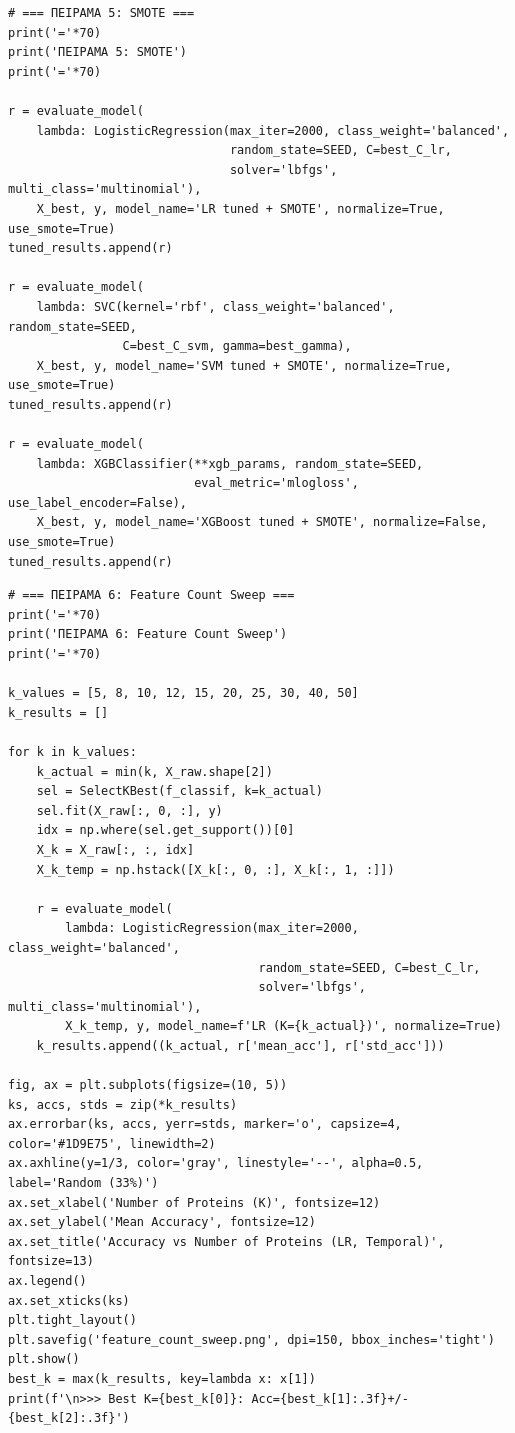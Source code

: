 \begin{lstlisting}
# === ΠΕΙΡΑΜΑ 5: SMOTE ===
print('='*70)
print('ΠΕΙΡΑΜΑ 5: SMOTE')
print('='*70)
 
r = evaluate_model(
    lambda: LogisticRegression(max_iter=2000, class_weight='balanced',
                               random_state=SEED, C=best_C_lr,
                               solver='lbfgs', multi_class='multinomial'),
    X_best, y, model_name='LR tuned + SMOTE', normalize=True, use_smote=True)
tuned_results.append(r)
 
r = evaluate_model(
    lambda: SVC(kernel='rbf', class_weight='balanced', random_state=SEED,
                C=best_C_svm, gamma=best_gamma),
    X_best, y, model_name='SVM tuned + SMOTE', normalize=True, use_smote=True)
tuned_results.append(r)
 
r = evaluate_model(
    lambda: XGBClassifier(**xgb_params, random_state=SEED,
                          eval_metric='mlogloss', use_label_encoder=False),
    X_best, y, model_name='XGBoost tuned + SMOTE', normalize=False, use_smote=True)
tuned_results.append(r)
\end{lstlisting}
 
\begin{lstlisting}
# === ΠΕΙΡΑΜΑ 6: Feature Count Sweep ===
print('='*70)
print('ΠΕΙΡΑΜΑ 6: Feature Count Sweep')
print('='*70)
 
k_values = [5, 8, 10, 12, 15, 20, 25, 30, 40, 50]
k_results = []
 
for k in k_values:
    k_actual = min(k, X_raw.shape[2])
    sel = SelectKBest(f_classif, k=k_actual)
    sel.fit(X_raw[:, 0, :], y)
    idx = np.where(sel.get_support())[0]
    X_k = X_raw[:, :, idx]
    X_k_temp = np.hstack([X_k[:, 0, :], X_k[:, 1, :]])
 
    r = evaluate_model(
        lambda: LogisticRegression(max_iter=2000, class_weight='balanced',
                                   random_state=SEED, C=best_C_lr,
                                   solver='lbfgs', multi_class='multinomial'),
        X_k_temp, y, model_name=f'LR (K={k_actual})', normalize=True)
    k_results.append((k_actual, r['mean_acc'], r['std_acc']))
 
fig, ax = plt.subplots(figsize=(10, 5))
ks, accs, stds = zip(*k_results)
ax.errorbar(ks, accs, yerr=stds, marker='o', capsize=4, color='#1D9E75', linewidth=2)
ax.axhline(y=1/3, color='gray', linestyle='--', alpha=0.5, label='Random (33%)')
ax.set_xlabel('Number of Proteins (K)', fontsize=12)
ax.set_ylabel('Mean Accuracy', fontsize=12)
ax.set_title('Accuracy vs Number of Proteins (LR, Temporal)', fontsize=13)
ax.legend()
ax.set_xticks(ks)
plt.tight_layout()
plt.savefig('feature_count_sweep.png', dpi=150, bbox_inches='tight')
plt.show()
best_k = max(k_results, key=lambda x: x[1])
print(f'\n>>> Best K={best_k[0]}: Acc={best_k[1]:.3f}+/-{best_k[2]:.3f}')
\end{lstlisting}
 
